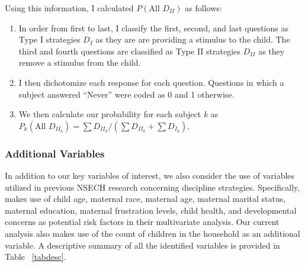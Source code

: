 \documentclass[1p, review]{elsarticle}\usepackage[]{graphicx}\usepackage[]{color}
\begin{document}
Using this information, I calculated $P(\text{All } D_{II})$ as follows: 

\begin{enumerate}
  \item In order from first to last, I classify the first, second, and last questions as Type I strategies $D_I$ as they are are providing a stimulus to the child. The third and fourth questions are classified as Type II strategies $D_{II}$ as they remove a stimulus from the child. 
  \item I then dichotomize each response for each question. Questions in which a subject answered ``Never'' were coded as 0 and 1 otherwise. 
  \item We then calculate our probability for each subject $k$ as \\ 
  $P_k(\text{All }D_{II_k})=\sum{D_{II_k}}/(\sum{D_{II_k}}+\sum{D_{I_k}})$.
\end{enumerate}

\subsubsection{Additional Variables}

In addition to our key variables of interest, we also consider the use of variables utilized in previous NSECH research concerning discipline strategies. Specifically, \citet{Regalado2004} makes use of child age, maternal race, maternal age, maternal marital status, maternal education, maternal frustration levels, child health, and developmental concerns as potential risk factors in their multivariate analysis. Our current analysis also makes use of the count of children in the household as an additional variable. A descriptive summary of all the identified variables is provided in Table~ \ref{tabdesc}. 
\end{document}
